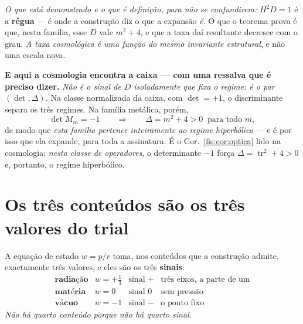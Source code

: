 \documentclass[livro.tex]{subfiles}
\begin{document}
\medskip\noindent\emph{O que está demonstrado e o que é definição, para não se
confundirem:} $H^{2}D=1$ é a \textbf{régua} --- é onde a construção diz o que a
expansão \emph{é}. O que o teorema prova é que, nesta família, esse $D$ vale
$m^{2}+4$, e que a taxa daí resultante decresce com o grau. \emph{A taxa
cosmológica é uma função do mesmo invariante estrutural}, e não uma escala nova.

\medskip\noindent\textbf{E aqui a cosmologia encontra a caixa --- com uma
ressalva que é preciso dizer.} \emph{Não é o sinal de $D$ isoladamente que fixa o
regime: é o par $(\det,\Delta)$.} Na classe normalizada da caixa, com
$\det=+1$, o discriminante separa os três regimes. Na família metálica, porém,
\[
\det M_m=-1
\qquad\Longrightarrow\qquad
\Delta=m^{2}+4>0\ \text{ para todo } m ,
\]
de modo que \emph{esta família pertence inteiramente ao regime hiperbólico} ---
e é por isso que ela expande, para toda a assinatura. É o
Cor.~\ref{fis:cor:optica} lido na cosmologia: \emph{nesta classe de operadores},
o determinante $-1$ força $\Delta=\operatorname{tr}^{2}+4>0$ e, portanto, o
regime hiperbólico.


\section{Os três conteúdos são os três valores do trial}\label{fis:conteudos}

\begin{teorema}\label{fis:thm:conteudos}
A equação de estado $w=p/r$ toma, nos conteúdos que a construção admite,
exactamente três valores, e eles são os três \textbf{sinais}:
\[
\begin{array}{llcl}
\textbf{radiação} & w=+\tfrac13 & \text{sinal }+ & \text{três eixos, a parte de um}\\[2pt]
\textbf{matéria}  & w=0         & \text{sinal }0 & \text{sem pressão}\\[2pt]
\textbf{vácuo}    & w=-1        & \text{sinal }- & \text{o ponto fixo}
\end{array}
\]
\emph{Não há quarto conteúdo porque não há quarto sinal.}
\end{teorema}
\end{document}

